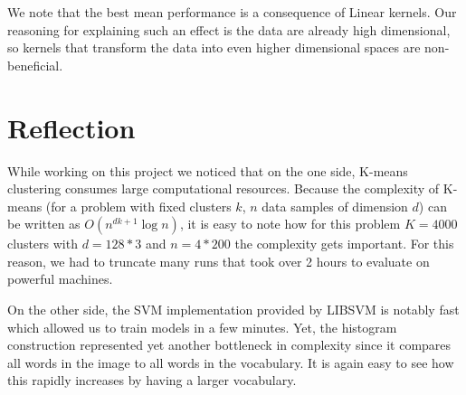 \documentclass[11pt]{article}
\begin{document}
We note that the best mean performance is a consequence of Linear kernels. Our reasoning for explaining such an effect is the data are already high dimensional, so kernels that transform the data into even higher dimensional spaces are non-beneficial.

\section{Reflection}
While working on this project we noticed that on the one side, K-means clustering consumes large computational resources. Because the complexity of K-means (for a problem with fixed clusters $k$, $n$ data samples of dimension $d$) can be written as $O(n^{dk+1}\log{n})$, it is easy to note how for this problem $K=4000$ clusters with $d=128*3$ and $n=4*200$ the complexity gets important. For this reason, we had to truncate many runs that took over 2 hours to evaluate on powerful machines. 

On the other side, the SVM implementation provided by LIBSVM is notably fast which allowed us to train models in a few minutes. Yet, the histogram construction represented yet another bottleneck in complexity since it compares all words in the image to all words in the vocabulary. It is again easy to see how this rapidly increases by having a larger vocabulary.
\end{document}
